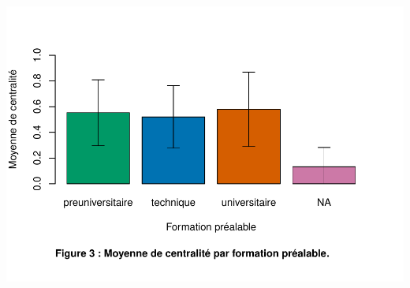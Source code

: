\documentclass[preprint, 3p,
authoryear]{elsarticle} %
\begin{document}
\includegraphics{rapport_final_files/figure-latex/unnamed-chunk-3-1.pdf}

\renewcommand\refname{References}

\end{document}
